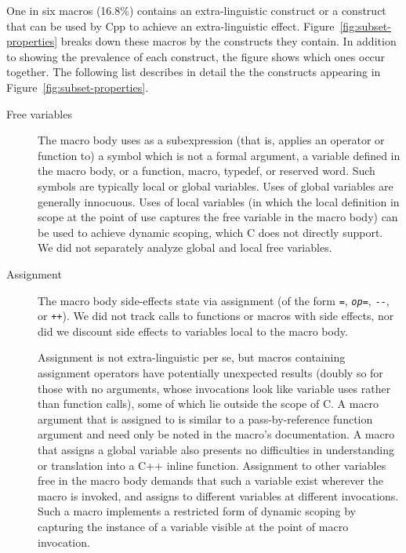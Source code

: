 \documentclass[10pt]{article}
\begin{document}
One in six macros (16.8\%) contains an extra-linguistic construct or a
construct that can be used by Cpp to achieve an extra-linguistic effect.
Figure~\ref{fig:subset-properties} breaks down these macros by the
constructs they contain.  In addition to showing the prevalence of each
construct, the figure shows which ones occur together.  The following list
describes in detail the the constructs appearing in
Figure~\ref{fig:subset-properties}.


\label{desc:properties}

\begin{description}
\item[Free variables]\label{page:freevar}
  The macro body uses as a subexpression (that is, applies an operator or
  function to) a symbol which is not a formal argument, a variable defined
  in the macro body, or a function, macro, typedef, or reserved word.  Such
  symbols are typically local or global variables.  Uses of global
  variables are generally innocuous.  Uses of local variables (in which the
  local definition in scope at the point of use captures the free variable
  in the macro body) can be used to achieve dynamic scoping, which C does
  not directly support.  We did not separately analyze global and local
  free variables.

\item[Assignment]
  The macro body side-effects state via assignment (of the form {\tt =},
  {\tt {\em op}=}, {\tt -{}-}, or {\tt ++}).  We did not track calls to
  functions or macros with side effects, nor did we discount side
  effects to variables local to the macro body.  
  
  Assignment is not extra-linguistic per se, but macros containing
  assignment operators have potentially unexpected results (doubly so for
  those with no arguments, whose invocations look like variable uses rather
  than
  function calls), some of which lie outside the scope of C\@.  A macro
  argument that is assigned to is similar to a pass-by-reference function
  argument and need only be noted in the macro's documentation.  A macro
  that assigns a global variable also presents no difficulties in
  understanding or translation into a C++ inline function.  Assignment to
  other variables free in the macro body demands that such a variable exist
  wherever the macro is invoked, and assigns to different variables at
  different invocations.  Such a macro implements a restricted form of
  dynamic scoping by capturing the instance of a variable visible at the
  point of macro invocation.


\end{description}
\end{document}
